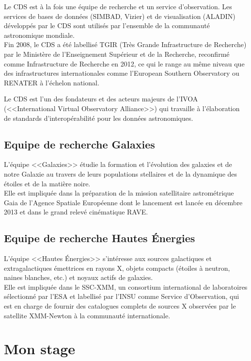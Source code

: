 \documentclass[a4paper,french,12pt]{article}
\begin{document}
		Le CDS est à la fois une équipe de recherche et un service d’observation.
		Les services de bases de données (SIMBAD, Vizier) et de visualisation (ALADIN) développés par le CDS
		sont utilisés par l’ensemble de la communauté astronomique mondiale. \\
		Fin 2008, le CDS a été labellisé TGIR (Très Grande Infrastructure de Recherche) par le Ministère de l'Enseignement Supérieur et de la Recherche, 
		reconfirmé comme Infrastructure de Recherche en 2012, ce qui le range au même niveau que des infrastructures internationales
		comme l’European Southern Observatory ou RENATER à l’échelon national.
		
		Le CDS est l'un des fondateurs et des acteurs majeurs de l'IVOA (<<International Virtual Observatory Alliance>>) qui travaille à
		l'élaboration de standards d'interopérabilité pour les données astronomiques.

	\subsection{Equipe de recherche Galaxies}
	
		L’équipe <<Galaxies>> étudie la formation et l’évolution des galaxies et de notre Galaxie 
		au travers de leurs populations stellaires et de la dynamique des étoiles et de la matière noire. \\
		Elle est impliquée dans la préparation de la mission satellitaire astrométrique Gaia de l’Agence Spatiale Européenne 
		dont le lancement est lancée en décembre 2013 et dans le grand relevé cinématique RAVE. 
	
	\subsection{Equipe de recherche Hautes Énergies} 
	
		L’équipe <<Hautes Énergies>> s’intéresse aux sources galactiques et extragalactiques émettrices en rayons X,
		objets compacts (étoiles à neutron, naines blanches, etc.) et noyaux actifs de galaxies.\\
		Elle est impliquée dans le SSC-XMM, un consortium international de laboratoires sélectionné par l’ESA
		et labellisé par l’INSU comme Service d’Observation, qui est en charge de fournir des catalogues complets
		de sources X observées par le satellite XMM-Newton à la communauté internationale. 

\section{Mon stage}
\end{document}
